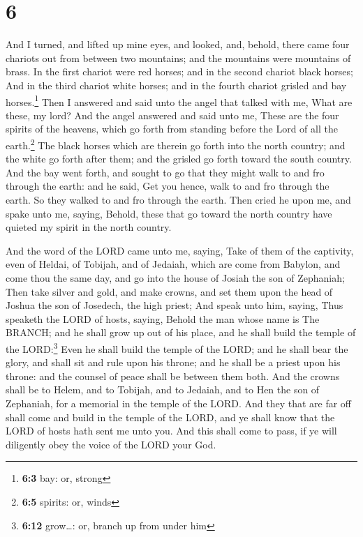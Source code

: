 \hypertarget{section-5}{%
\section{6}\label{section-5}}

 And I turned, and lifted up mine eyes, and looked, and,
behold, there came four chariots out from between two mountains; and the
mountains were mountains of brass.  In the first chariot
were red horses; and in the second chariot black horses; 
And in the third chariot white horses; and in the fourth chariot grisled
and bay horses.\footnote{\textbf{6:3} bay: or, strong} 
Then I answered and said unto the angel that talked with me, What are
these, my lord?  And the angel answered and said unto me,
These are the four spirits of the heavens, which go forth from standing
before the Lord of all the earth.\footnote{\textbf{6:5} spirits: or,
  winds}  The black horses which are therein go forth into
the north country; and the white go forth after them; and the grisled go
forth toward the south country.  And the bay went forth,
and sought to go that they might walk to and fro through the earth: and
he said, Get you hence, walk to and fro through the earth. So they
walked to and fro through the earth.  Then cried he upon
me, and spake unto me, saying, Behold, these that go toward the north
country have quieted my spirit in the north country.

 And the word of the LORD came unto me, saying,
 Take of them of the captivity, even of Heldai, of
Tobijah, and of Jedaiah, which are come from Babylon, and come thou the
same day, and go into the house of Josiah the son of Zephaniah;
 Then take silver and gold, and make crowns, and set them
upon the head of Joshua the son of Josedech, the high priest;
 And speak unto him, saying, Thus speaketh the LORD of
hosts, saying, Behold the man whose name is The BRANCH; and he shall
grow up out of his place, and he shall build the temple of the
LORD:\footnote{\textbf{6:12} grow\ldots: or, branch up from under him}
 Even he shall build the temple of the LORD; and he shall
bear the glory, and shall sit and rule upon his throne; and he shall be
a priest upon his throne: and the counsel of peace shall be between them
both.  And the crowns shall be to Helem, and to Tobijah,
and to Jedaiah, and to Hen the son of Zephaniah, for a memorial in the
temple of the LORD.  And they that are far off shall come
and build in the temple of the LORD, and ye shall know that the LORD of
hosts hath sent me unto you. And this shall come to pass, if ye will
diligently obey the voice of the LORD your God.

